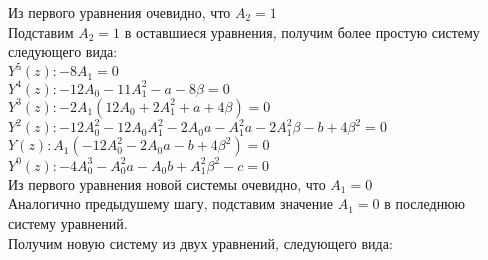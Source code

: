\documentclass[12pt,a4paper,draft]{letter}
\begin{document}
Из первого уравнения очевидно, что $A_2 = 1$ \\
Подставим $A_2 = 1$ в оставшиеся уравнения, получим более простую систему следующего вида: 
\\
$Y^5(z): -8 A_1= 0$\\
$Y^4(z): -12 A_0 - 11 A_1^2 - a - 8 \beta= 0$\\
$Y^3(z):  -2 A_1 (12 A_0 + 2 A_1^2 + a + 4 \beta)= 0$\\
$Y^2(z):  -12 A_0^2 - 12 A_0 A_1^2 - 2 A_0 a - A_1^2 a - 2 A_1^2 \beta - b + 4 \beta^2= 0$\\
$Y(z):  A_1 (-12 A_0^2 - 2 A_0 a - b + 4 \beta^2)= 0$\\
$Y^0(z):  -4 A_0^3 - A_0^2 a - A_0 b + A_1^2 \beta^2 - c= 0$\\
Из первого уравнения новой системы очевидно, что $A_1 = 0$\\
Аналогично предыдушему шагу, подставим значение $A_1 = 0$ в последнюю систему уравнений.\\
Получим новую систему из двух уравнений, следующего вида:\\
\end{document}
